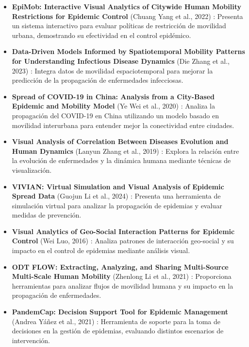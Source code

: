 \documentclass[sigconf]{acmart}
\begin{document}
\begin{itemize}
    \item \textbf{EpiMob: Interactive Visual Analytics of Citywide Human Mobility Restrictions for Epidemic Control} (Chuang Yang et al., 2022) \cite{yang2022epimob}: Presenta un sistema interactivo para evaluar políticas de restricción de movilidad urbana, demostrando su efectividad en el control epidémico.

    \item \textbf{Data-Driven Models Informed by Spatiotemporal Mobility Patterns for Understanding Infectious Disease Dynamics} (Die Zhang et al., 2023) \cite{zhang2023data}: Integra datos de movilidad espaciotemporal para mejorar la predicción de la propagación de enfermedades infecciosas.

    \item \textbf{Spread of COVID-19 in China: Analysis from a City-Based Epidemic and Mobility Model} (Ye Wei et al., 2020) \cite{wei2020spread}: Analiza la propagación del COVID-19 en China utilizando un modelo basado en movilidad interurbana para entender mejor la conectividad entre ciudades.

    \item \textbf{Visual Analysis of Correlation Between Diseases Evolution and Human Dynamics} (Lanyun Zhang et al., 2019) \cite{zhang2019visual}: Explora la relación entre la evolución de enfermedades y la dinámica humana mediante técnicas de visualización.

    \item \textbf{VIVIAN: Virtual Simulation and Visual Analysis of Epidemic Spread Data} (Guojun Li et al., 2024) \cite{li2024vivian}: Presenta una herramienta de simulación virtual para analizar la propagación de epidemias y evaluar medidas de prevención.

    \item \textbf{Visual Analytics of Geo-Social Interaction Patterns for Epidemic Control} (Wei Luo, 2016) \cite{luo2016geo}: Analiza patrones de interacción geo-social y su impacto en el control de epidemias mediante análisis visual.

    \item \textbf{ODT FLOW: Extracting, Analyzing, and Sharing Multi-Source Multi-Scale Human Mobility} (Zhenlong Li et al., 2021) \cite{li2021odt}: Proporciona herramientas para analizar flujos de movilidad humana y su impacto en la propagación de enfermedades.

    \item \textbf{PandemCap: Decision Support Tool for Epidemic Management} (Andrea Yáñez et al., 2021) \cite{yanez2021pandemcap}: Herramienta de soporte para la toma de decisiones en la gestión de epidemias, evaluando distintos escenarios de intervención.


\end{itemize}
\end{document}

